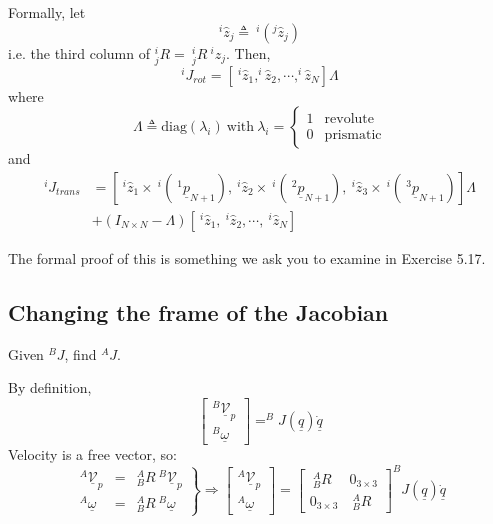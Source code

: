 \documentclass[]{article}
\begin{document}
Formally, let
\begin{displaymath}
	^{i}\hat{z}_{j} \triangleq\ ^{i}(^{j}\hat{z}_{j})
\end{displaymath}
i.e. the third column of $^{i}_{j}R =\ ^{i}_{j}R\ ^{i}z_{j}$. Then,
\begin{displaymath}
^{i}J_{rot} = \left[\ ^{i}\hat{z}_{1}, ^{i}\hat{z}_{2}, \cdots, ^{i}\hat{z}_{N}\right] \Lambda
\end{displaymath}
where
\begin{displaymath}
	\Lambda \triangleq \text{diag}(\lambda_{i})\ \text{with}\ \lambda_{i} = \left\{ \begin{array}{cl} 1 & \text{revolute} \\ 0 & \text{prismatic} \end{array} \right.
\end{displaymath}
and
\begin{displaymath}
\begin{split}
^{i}J_{trans} & = \left[\ \!^{i}\hat{z}_{1} \times\ ^{i}(\ \! ^{1}\underline{p}_{N+1}), \ \!^{i}\hat{z}_{2} \times\ ^{i}(\ \! ^{2}\underline{p}_{N+1}), \ \!^{i}\hat{z}_{3} \times\ ^{i}(\ \! ^{3}\underline{p}_{N+1})\right] \Lambda \\
& + (I_{N \times N} - \Lambda) \left[\ \!^{i}\hat{z}_{1}, \ \!^{i}\hat{z}_{2}, \cdots, \ \!^{i}\hat{z}_{N} \right]
\end{split}
\end{displaymath}

The formal proof of this is something we ask you to examine in Exercise 5.17.

\subsection{Changing the frame of the Jacobian}
Given $^{B}J$, find $^{A}J$.

By definition,
\begin{displaymath}
\left[\begin{array}{c} ^{B}\underline{\mathcal{V}}_{p} \\ ^{B}\underline{\omega} \end{array} \right] = ^{B}J(\underline{q})\underline{\dot{q}}
\end{displaymath}
Velocity is a free vector, so:
\begin{displaymath}
\left. \begin{array}{ccl} ^{A}\underline{\mathcal{V}}_{p} & = & ^{A}_{B}R\ \!^{B}\underline{\mathcal{V}}_{p} \\ ^{A}\underline{\omega} & = & ^{A}_{B}R\ \!^{B}\underline{\omega} \end{array} \right\} \Rightarrow \left[\begin{array}{c} ^{A}\underline{\mathcal{V}}_{p} \\ ^{A}\underline{\omega} \end{array} \right] = \left[ \begin{array}{cc} \ \!^{A}_{B}R & 0_{3 \times 3} \\ 0_{3 \times 3} &  \ \!^{A}_{B}R \end{array} \right]^{B}J(\underline{q})\dot{\underline{q}}
\end{displaymath}
\end{document}
